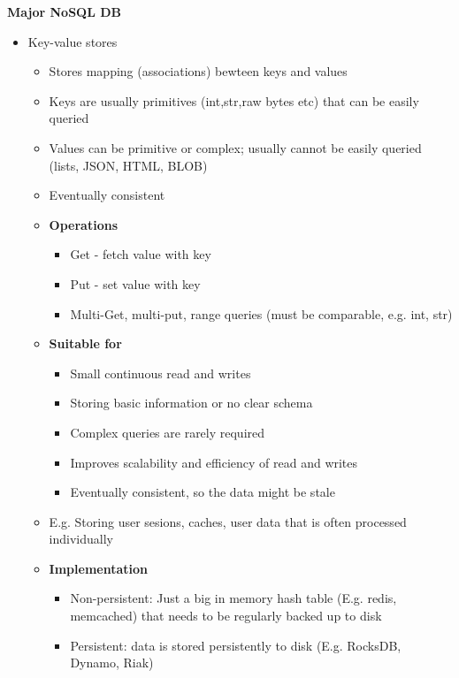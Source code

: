 \documentclass[10pt, landscape]{article}
\begin{document}
\begin{multicols}{4}
\textbf{Major NoSQL DB}
\begin{itemize}
  \item Key-value stores
  \begin{itemize}
    \item Stores mapping (associations) bewteen keys and values 
    \item Keys are usually primitives (int,str,raw bytes etc) that can be easily queried 
    \item Values can be primitive or complex; usually cannot be easily queried (lists, JSON, HTML, BLOB)
    \item Eventually consistent
    \item \textbf{Operations}
    \begin{itemize}
      \item Get - fetch value with key 
      \item Put - set value with key 
      \item Multi-Get, multi-put, range queries (must be comparable, e.g. int, str)
    \end{itemize}
    \item \textbf{Suitable for}
    \begin{itemize}
      \item Small continuous read and writes
      \item Storing basic information or no clear schema
      \item Complex queries are rarely required
      \item Improves scalability and efficiency of read and writes 
      \item Eventually consistent, so the data might be stale 
    \end{itemize}
    \item E.g. Storing user sesions, caches, user data that is often processed individually
    \item \textbf{Implementation}
    \begin{itemize}
      \item Non-persistent: Just a big in memory hash table (E.g. redis, memcached) that needs to be regularly backed up to disk
      \item Persistent: data is stored persistently to disk (E.g. RocksDB, Dynamo, Riak)
    \end{itemize}
  \end{itemize}


\end{itemize}
\end{multicols}
\end{document}
